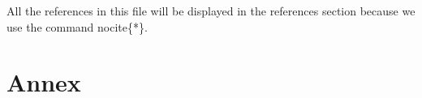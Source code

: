 \documentclass[Theme1]{{template_material/eurostat}}
\begin{document}
All the references in this file will be displayed in the references section because we use the command nocite\{*\}. 



\newpage %
\pagestyle{unnumstyle} %

\nocite{*}  

 


\newpage %
\section*{Annex}
\lipsum[1-10]
\newpage %

\end{document}
